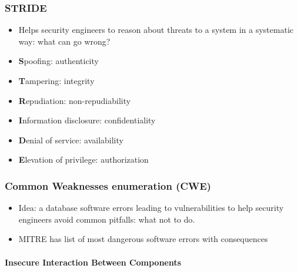 \documentclass{article}
\newenvironment{myitemize}
{ \begin{itemize}
    \setlength{\itemsep}{005pt}
    \setlength{\parskip}{0pt}
    \setlength{\parsep}{0pt}     }
{ \end{itemize}                  }
\begin{document}
\begin{multicols}{2}
\subsubsection{STRIDE}

\begin{myitemize}
    \item Helps security engineers to reason about threats to a system in a systematic way: what can go wrong?
    \item \textbf{S}poofing: authenticity
    \item \textbf{T}ampering: integrity
    \item \textbf{R}epudiation: non-repudiability
    \item \textbf{I}nformation disclosure: confidentiality
    \item \textbf{D}enial of service:  availability
    \item \textbf{E}levation of privilege: authorization
\end{myitemize}

\subsubsection{Common Weaknesses enumeration (CWE)}

\begin{myitemize}
    \item Idea: a database software errors leading to vulnerabilities to help security engineers avoid common pitfalls: what not to do. 
    \item MITRE has list of most dangerous software errors with consequences
\end{myitemize}

\paragraph{Insecure Interaction Between Components}


\end{multicols}
\end{document}
